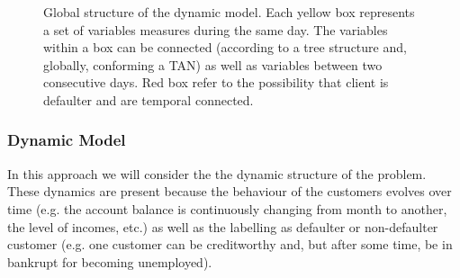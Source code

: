 \begin{figure}[ht]
\begin{center}
\end{center}
\caption{Global structure of the dynamic model. Each yellow box represents a set of variables measures during the same day.
The variables within a box can be connected (according to a tree structure and, globally, conforming a TAN) as well as variables between two consecutive days. Red box refer to the possibility that 
client is defaulter and are temporal connected.}
\label{fig:global_temp}
\end{figure}


\subsubsection*{Dynamic Model} 

In this approach we will consider the the dynamic structure of the problem. These dynamics are present because the behaviour of the customers evolves over time (e.g. the account balance is continuously changing from month to another, the level of incomes, etc.)  as well as the labelling as defaulter or non-defaulter customer (e.g. one customer can be creditworthy and, but after some time, be in bankrupt for becoming unemployed). 


